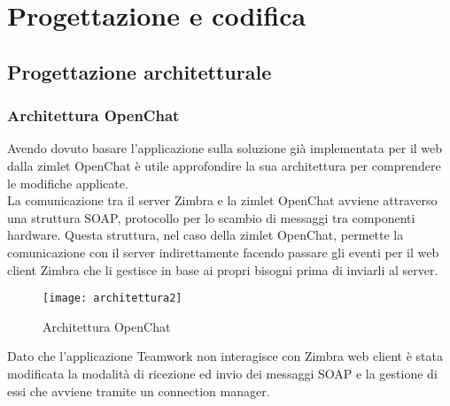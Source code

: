 
\chapter{Progettazione e codifica}\label{chap:design}

\section {Progettazione architetturale}
\subsection{Architettura OpenChat}
Avendo dovuto basare l'applicazione sulla soluzione già implementata per il web dalla zimlet OpenChat è utile approfondire la sua architettura per comprendere le modifiche applicate. \\
La comunicazione tra il server Zimbra e la zimlet OpenChat avviene attraverso una struttura SOAP, protocollo per lo scambio di messaggi tra componenti hardware.
Questa struttura, nel caso della zimlet OpenChat, permette la comunicazione con il server indirettamente facendo passare gli eventi per il web client Zimbra che li gestisce in base ai propri bisogni prima di inviarli al server. \\
\begin{figure}[H] 
	\centering
	\texttt{[image: architettura2]}
	\caption{Architettura OpenChat}
\end{figure}
Dato che l'applicazione Teamwork non interagisce con Zimbra web client è stata modificata la modalità di ricezione ed invio dei messaggi SOAP e la gestione di essi che avviene tramite un connection manager.


